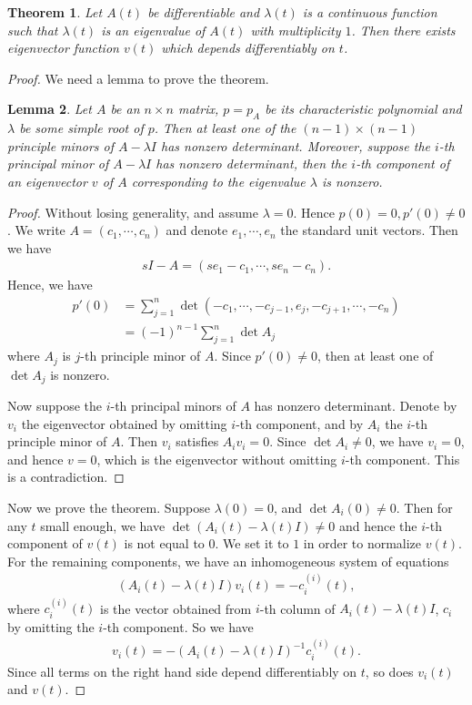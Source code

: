 \documentclass[11pt]{book}
\newtheorem{theorem}{Theorem}[section]
\newtheorem{lemma}[theorem]{Lemma}
\theoremstyle{definition}
\numberwithin{equation}{chapter}
\begin{document}
\begin{theorem}
Let $A(t)$ be differentiable and $\lambda(t)$ is a continuous function such that $\lambda(t)$ is an eigenvalue of $A(t)$ with multiplicity $1$. Then there exists eigenvector function $v(t)$ which depends differentiably on $t$. 
\end{theorem}
\begin{proof}
We need a lemma to prove the theorem.
\begin{lemma}
Let $A$ be an $n\times n$ matrix, $p = p_A$ be its characteristic polynomial and $\lambda$ be some simple root of $p$. Then at least one of the $(n-1)\times(n-1)$ principle minors of $A - \lambda I$ has nonzero determinant. Moreover, suppose the $i$-th principal minor of $A - \lambda I$ has nonzero determinant, then the $i$-th component of an eigenvector $v$ of $A$ corresponding to the eigenvalue $\lambda$ is nonzero.
\end{lemma}
\begin{proof}
Without losing generality, and assume $\lambda = 0$. Hence $p(0) = 0, p'(0) \neq 0$. We write $A = (c_1, \cdots, c_n)$ and denote $e_1, \cdots, e_n$ the standard unit vectors. Then we have
\begin{align*}
    s I - A = (se_1 - c_1, \cdots, se_n - c_n).
\end{align*}
Hence, we have
\begin{align*}
    p'(0) & = \sum^n_{j=1} \det (-c_1, \cdots, -c_{j-1}, e_j, -c_{j+1},\cdots, -c_n) \\
    & = (-1)^{n-1} \sum^n_{j=1} \det A_j
\end{align*}
where $A_j$ is $j$-th principle minor of $A$. Since $p'(0) \neq 0$, then at least one of $\det A_j$ is nonzero.

Now suppose the $i$-th principal minors of $A$ has nonzero determinant. Denote by $v_i$ the eigenvector obtained by omitting $i$-th component, and by $A_i$ the $i$-th principle minor of $A$. Then $v_i$ satisfies $A_i v_i = 0$. Since $\det A_i \neq 0$, we have $v_i = 0$, and hence $v = 0$, which is the eigenvector without omitting $i$-th component. This is a contradiction.
\end{proof}

Now we prove the theorem. Suppose $\lambda(0) = 0$, and $\det A_i(0) \neq 0$. Then for any $t$ small enough, we have $\det (A_i(t) - \lambda(t)I) \neq 0$ and hence the $i$-th component of $v(t)$ is not equal to $0$. We set it to $1$ in order to normalize $v(t)$. For the remaining components, we have an inhomogeneous system of equations 
\begin{align*}
    \left(A_i(t) - \lambda(t)I \right) v_i(t) = - c_i^{(i)}(t),
\end{align*}
where $c_i^{(i)}(t)$ is the vector obtained from $i$-th column of $A_i(t) - \lambda(t)I$, $c_i$ by omitting the $i$-th component. So we have 
\begin{align*}
    v_i(t) = - \left(A_i(t) - \lambda(t)I \right)^{-1} c_i^{(i)}(t).
\end{align*}
Since all terms on the right hand side depend differentiably on $t$, so does $v_i(t)$ and $v(t)$. 
\end{proof}
\end{document}
